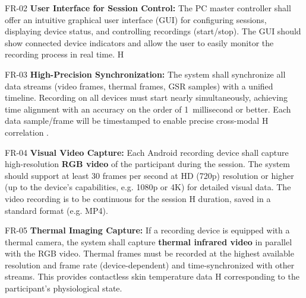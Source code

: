  FR-02                   \textbf{User Interface for Session Control:} The PC master controller shall offer an intuitive graphical user interface (GUI) for configuring sessions, displaying device status, and controlling recordings (start/stop). The GUI should show connected device indicators and allow the user to easily monitor the recording process in real time.                                     H

  FR-03                   \textbf{High-Precision Synchronization:} The system shall synchronize all data streams (video frames, thermal frames, GSR samples) with a unified timeline. Recording on all devices must start nearly simultaneously, achieving time alignment with an accuracy on the order of 1 millisecond or better. Each data sample/frame will be timestamped to enable precise cross-modal      H
                          correlation \cite{Boucsein2012}.                                                                                                                                                                                                                                  

  FR-04                   \textbf{Visual Video Capture:} Each Android recording device shall capture high-resolution \textbf{RGB video} of the participant during the session. The system should support at least 30 frames per second at HD (720p) resolution or higher (up to the device's capabilities, e.g. 1080p or 4K) for detailed visual data. The video recording is to be continuous for the session         H
                          duration, saved in a standard format (e.g. MP4).                                                                                                                                                                                                                                                                                                                                   

  FR-05                   \textbf{Thermal Imaging Capture:} If a recording device is equipped with a thermal camera, the system shall capture \textbf{thermal infrared video} in parallel with the RGB video. Thermal frames must be recorded at the highest available resolution and frame rate (device-dependent) and time-synchronized with other streams. This provides contactless skin temperature data          H
                          corresponding to the participant's physiological state.                                                                                                                                                                                                                                                                                                                            

